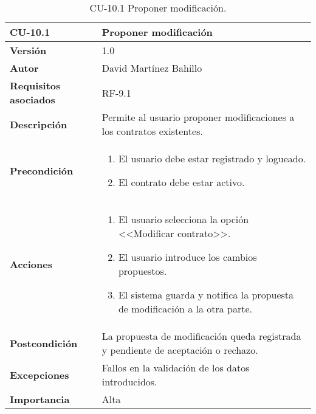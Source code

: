 \begin{table}[p]
	\centering
	\begin{tabularx}{\linewidth}{ p{} p{} }
		\toprule
		\textbf{CU-10.1}  & \textbf{Proponer modificación}\\
		\midrule
		\textbf{Versión}              & 1.0    \\
		\textbf{Autor}                & David Martínez Bahillo \\
		\textbf{Requisitos asociados} & RF-9.1 \\
		\textbf{Descripción}          & Permite al usuario proponer modificaciones a los contratos existentes. \\
		\textbf{Precondición}         &  
		\begin{enumerate}
			\item El usuario debe estar registrado y logueado.
			\item El contrato debe estar activo.
		\end{enumerate}\\
		\textbf{Acciones}             &
		\begin{enumerate}
			\item El usuario selecciona la opción <<Modificar contrato>>.
			\item El usuario introduce los cambios propuestos.
			\item El sistema guarda y notifica la propuesta de modificación a la otra parte.
		\end{enumerate}\\
		\textbf{Postcondición}        & La propuesta de modificación queda registrada y pendiente de aceptación o rechazo. \\
		\textbf{Excepciones}          & Fallos en la validación de los datos introducidos. \\
		\textbf{Importancia}          & Alta \\
		\bottomrule
	\end{tabularx}
	\caption{CU-10.1 Proponer modificación.}
\end{table}



